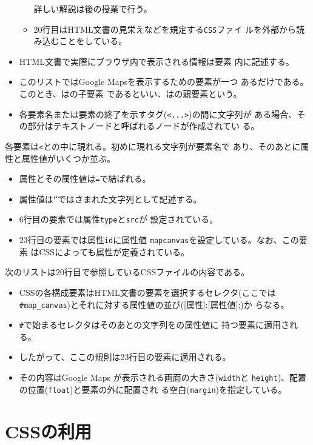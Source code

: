 \begin{Exec}
\begin{itemize}
\begin{itemize}
		詳しい解説は後の授業で行う。
	  \item 20行目はHTML文書の見栄えなどを規定する\texttt{CSS}ファイ
		ルを外部から読み込むことをしている。
	 \end{itemize}
 \item HTML文書で実際にブラウザ内で表示される情報は要素
       内に記述する。
 \item このリストではGoogle Mapsを表示するための要素が一つ
       あるだけである。このとき、はの子要素
       であるといい、はの親要素という。
 \item 各要素名または要素の終了を示すタグ(\texttt{<...>})の間に文字列が
       ある場合、その部分はテキストノードと呼ばれるノードが作成されてい
       る。
\end{itemize}
各要素は\texttt{<}と\texttt{}の中に現れる。初めに現れる文字列が要素名で
 あり、そのあとに属性と属性値がいくつか並ぶ。
\begin{itemize}
 \item 属性とその属性値は\texttt{=}で結ばれる。
 \item 属性値は\texttt{”}ではさまれた文字列として記述する。
 \item 6行目の要素では属性\texttt{type}と\texttt{src}が
       設定されている。
 \item 23行目の要素では属性\texttt{id}に属性値
       \texttt{map\textunderscore canvas}を設定している。なお、この要素
       はCSSによっても属性が定義されている。
\end{itemize}
次のリストは20行目で参照しているCSSファイルの内容である。
\begin{itemize}
 \item CSSの各構成要素はHTML文書の要素を選択するセレクタ(ここでは
       \Verb+#map_canvas+)とそれに対する属性値の並び([属性]:[属性値];)か
       らなる。
 \item \Verb+#+で始まるセレクタはそのあとの文字列をの属性値に
       持つ要素に適用される。
 \item したがって、ここの規則は23行目の要素に適用される。
 \item その内容はGoogle Maps が表示される画面の大きさ(\texttt{width}と
       \texttt{height})、配置の位置(\texttt{float})と要素の外に配置され
       る空白(\texttt{margin})を指定している。
\end{itemize}
\end{Exec}
\section{CSSの利用}

